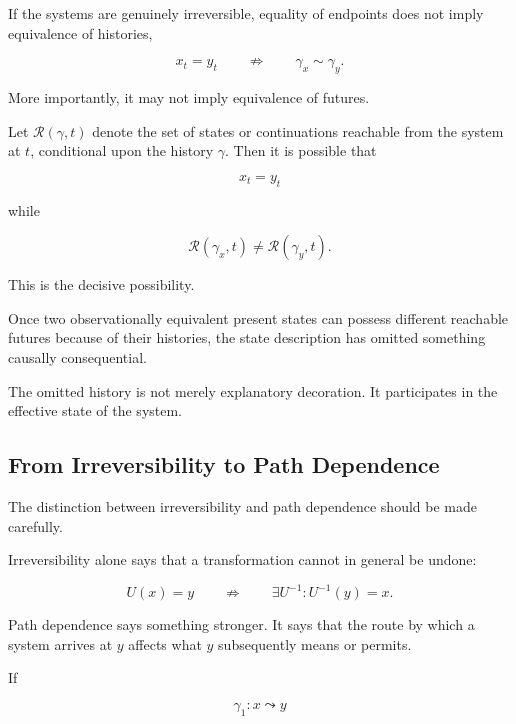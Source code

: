 \documentclass[11pt]{article}
\theoremstyle{remark}
\newcommand{\Reach}{\mathcal{R}}
\begin{document}
If the systems are genuinely irreversible, equality of endpoints does not imply equivalence of histories,

\begin{equation}
x_t = y_t
\qquad\not\Rightarrow\qquad
\gamma_x \sim \gamma_y.
\end{equation}

More importantly, it may not imply equivalence of futures.

Let $\Reach(\gamma,t)$ denote the set of states or continuations reachable from the system at $t$, conditional upon the history $\gamma$. Then it is possible that

\begin{equation}
x_t = y_t
\end{equation}

while

\begin{equation}
\Reach(\gamma_x,t)
\neq
\Reach(\gamma_y,t).
\end{equation}

This is the decisive possibility.

Once two observationally equivalent present states can possess different reachable futures because of their histories, the state description has omitted something causally consequential.

The omitted history is not merely explanatory decoration. It participates in the effective state of the system.

\subsection{From Irreversibility to Path Dependence}

The distinction between irreversibility and path dependence should be made carefully.

Irreversibility alone says that a transformation cannot in general be undone:

\begin{equation}
U(x)=y
\qquad\not\Rightarrow\qquad
\exists U^{-1}:U^{-1}(y)=x.
\end{equation}

Path dependence says something stronger. It says that the route by which a system arrives at $y$ affects what $y$ subsequently means or permits.

If

\begin{equation}
\gamma_1 : x \leadsto y
\end{equation}
\end{document}
